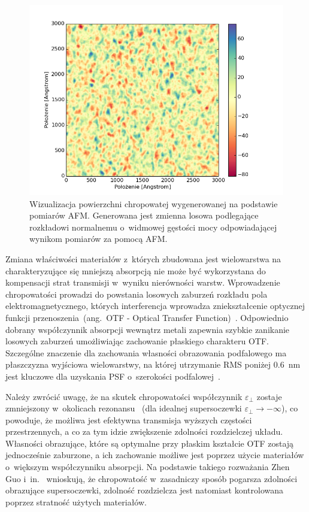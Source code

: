\begin{figure}[bt]
		\includegraphics[width=\textwidth]{images/multilayer/ag30nm-afm-generated.png}
		\caption{Wizualizacja powierzchni chropowatej wygenerowanej na podstawie pomiarów AFM. Generowana jest zmienna losowa podlegające rozkładowi normalnemu o~widmowej gęstości mocy odpowiadającej wynikom pomiarów za pomocą AFM.} 
		\label{fig:ag30nm-afmgene}
\end{figure}


Zmiana właściwości materiałów z~których zbudowana jest wielowarstwa na charakteryzujące się mniejszą absorpcją nie może być wykorzystana do kompensacji strat transmisji w~wyniku nierówności warstw. Wprowadzenie chropowatości prowadzi do powstania losowych zaburzeń rozkładu pola elektromagnetycznego, których interferencja wprowadza zniekształcenie optycznej funkcji przenoszenia~(ang.~OTF - Optical Transfer Function)~\cite{citeulike:2926459}. Odpowiednio dobrany współczynnik absorpcji wewnątrz metali zapewnia szybkie zanikanie losowych zaburzeń umożliwiając zachowanie płaskiego charakteru OTF. Szczególne znaczenie dla zachowania własności obrazowania podfalowego ma płaszczyzna wyjściowa wielowarstwy, na której utrzymanie RMS poniżej $0.6$~nm jest kluczowe dla uzyskania PSF o~szerokości podfalowej~\cite{guo2014negative}.

Należy zwrócić uwagę, że na skutek chropowatości współczynnik $\varepsilon_{\perp}$ zostaje zmniejszony w~okolicach rezonansu~\cite{guo2014negative} (dla idealnej supersoczewki $\varepsilon_{\perp} \to - \infty$), co powoduje, że możliwa jest efektywna transmisja wyższych częstości przestrzennych, a co za tym idzie zwiększenie zdolności rozdzielczej układu. Własności obrazujące, które są optymalne przy płaskim kształcie OTF zostają jednocześnie zaburzone, a ich zachowanie możliwe jest poprzez użycie materiałów o~większym współczynniku absorpcji. Na podstawie takiego rozważania Zhen Guo i~in.~\cite{guo2014negative} wnioskują, że chropowatość w~zasadniczy sposób pogarsza zdolności obrazujące supersoczewki, zdolność rozdzielcza jest natomiast kontrolowana poprzez stratność użytych materiałów.


